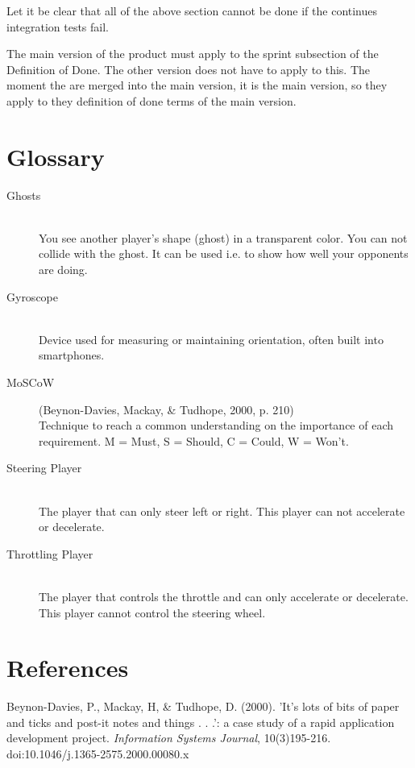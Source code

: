 \documentclass[11pt,twoside,a4paper]{article}
\begin{document}
Let it be clear that all of the above section cannot be done if the continues integration tests fail.

The main version of the product must apply to the sprint subsection of the Definition of Done. The other version does not have to apply to this. The moment the are merged into the main version, it is the main version, so they apply to they definition of done terms of the main version.


\newpage

\section{Glossary}

\begin{description}
\item[Ghosts] \hfill \\
You see another player's shape (ghost) in a transparent color. You can not collide with the ghost. It can be used i.e. to show how well your opponents are doing.
\item[Gyroscope] \hfill \\
Device used for measuring or maintaining orientation, often built into smartphones.
\item[MoSCoW] (Beynon-Davies, Mackay, \& Tudhope, 2000, p. 210) \hfill \\
Technique to reach a common understanding on the importance of each requirement. M = Must, S = Should, C = Could, W = Won't.
\item[Steering Player] \hfill \\
The player that can only steer left or right. This player can not accelerate or decelerate.
\item[Throttling Player] \hfill \\
The player that controls the throttle and can only accelerate or decelerate. This player cannot control the steering wheel.
\end{description}


\section*{References}
Beynon-Davies, P., Mackay, H, \& Tudhope, D. (2000). 'It's lots of bits of paper and ticks and post-it notes and things . . .': a case study of a rapid application development project. \emph{Information Systems Journal}, 10(3)195-216. doi:10.1046/j.1365-2575.2000.00080.x
\end{document}
